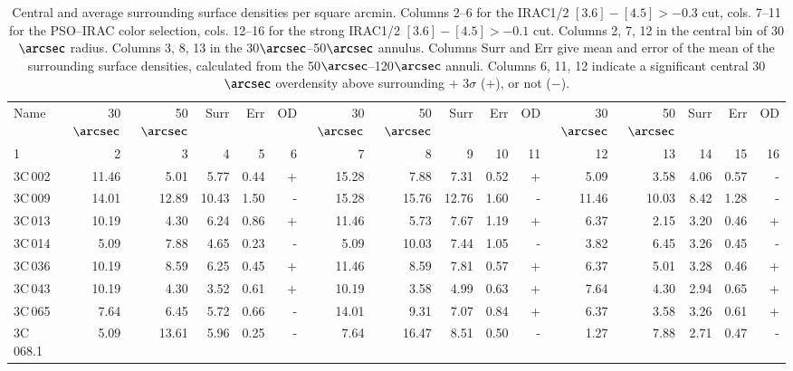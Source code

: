\documentclass[mathleft,fleqn,%
]{an}
\begin{document}
\begin{table*}
\renewcommand{\thetable}{\arabic{table}}
\centering
\footnotesize
\caption{Central and average surrounding surface densities per square arcmin. 
Columns 2--6 for the IRAC1/2 $[3.6] - [4.5] > -0.3$ cut, 
cols. 7--11 for the PSO--IRAC color selection,
cols. 12--16 for the strong IRAC1/2 $[3.6] - [4.5] > -0.1$ cut.
Columns 2, 7, 12 in the central bin of 30$\arcsec$ radius.
Columns 3, 8, 13 in the 30$\arcsec$--50$\arcsec$ annulus.
Columns Surr and Err give mean and error of the mean of the 
surrounding surface densities, calculated from the 50$\arcsec$--120$\arcsec$ annuli.
Columns 6, 11, 12 indicate a significant central 30$\arcsec$ overdensity above surrounding + 3$\sigma$ ($+$), or not ($-$).
} 
\label{table_overdensities}
\begin{tabular}{l|rrrrr|rrrrr|rrrrr}
\hline
Name       &  30$\arcsec$   & 50$\arcsec$ &  Surr &  Err &  OD  &  30$\arcsec$   &  50$\arcsec$ &  Surr &  Err &  OD & 30$\arcsec$   & 50$\arcsec$ &  Surr &  Err &  OD  \\
1       & 2  & 3  & 4 &  5 & 6  & 7  & 8& 9 & 10 & 11 & 12  & 13  & 14 &  15 & 16 \\
\hline     
     3C\,002 &  11.46 &   5.01 &   5.77 &   0.44 & +  &  15.28 &   7.88 &   7.31 &   0.52 & +  &   5.09 &   3.58 &   4.06 &   0.57 & -   \\
     3C\,009 &  14.01 &  12.89 &  10.43 &   1.50 & -  &  15.28 &  15.76 &  12.76 &   1.60 & -  &  11.46 &  10.03 &   8.42 &   1.28 & -   \\
     3C\,013 &  10.19 &   4.30 &   6.24 &   0.86 & +  &  11.46 &   5.73 &   7.67 &   1.19 & +  &   6.37 &   2.15 &   3.20 &   0.46 & +   \\
     3C\,014 &   5.09 &   7.88 &   4.65 &   0.23 & -  &   5.09 &  10.03 &   7.44 &   1.05 & -  &   3.82 &   6.45 &   3.26 &   0.45 & -   \\
     3C\,036 &  10.19 &   8.59 &   6.25 &   0.45 & +  &  11.46 &   8.59 &   7.81 &   0.57 & +  &   6.37 &   5.01 &   3.28 &   0.46 & +   \\
     3C\,043 &  10.19 &   4.30 &   3.52 &   0.61 & +  &  10.19 &   3.58 &   4.99 &   0.63 & +  &   7.64 &   4.30 &   2.94 &   0.65 & +   \\
     3C\,065 &   7.64 &   6.45 &   5.72 &   0.66 & -  &  14.01 &   9.31 &   7.07 &   0.84 & +  &   6.37 &   3.58 &   3.26 &   0.61 & +   \\
   3C\,068.1 &   5.09 &  13.61 &   5.96 &   0.25 & -  &   7.64 &  16.47 &   8.51 &   0.50 & -  &   1.27 &   7.88 &   2.71 &   0.47 & -   \\

\end{tabular}
\end{table*}
\end{document}
